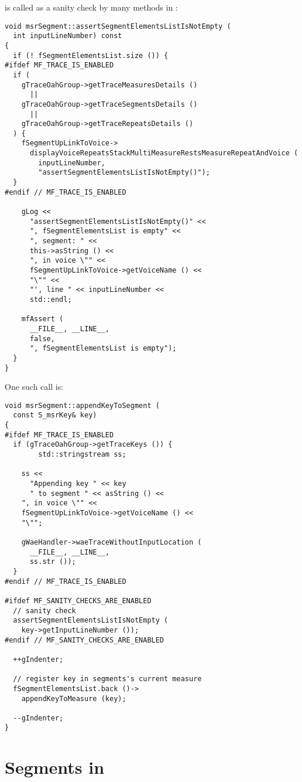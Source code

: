 is called as a sanity check by many methods in :
\begin{lstlisting}[language=CPlusPlus]
void msrSegment::assertSegmentElementsListIsNotEmpty (
  int inputLineNumber) const
{
  if (! fSegmentElementsList.size ()) {
#ifdef MF_TRACE_IS_ENABLED
  if (
    gTraceOahGroup->getTraceMeasuresDetails ()
      ||
    gTraceOahGroup->getTraceSegmentsDetails ()
      ||
    gTraceOahGroup->getTraceRepeatsDetails ()
  ) {
    fSegmentUpLinkToVoice->
      displayVoiceRepeatsStackMultiMeasureRestsMeasureRepeatAndVoice (
        inputLineNumber,
        "assertSegmentElementsListIsNotEmpty()");
  }
#endif // MF_TRACE_IS_ENABLED

    gLog <<
      "assertSegmentElementsListIsNotEmpty()" <<
      ", fSegmentElementsList is empty" <<
      ", segment: " <<
      this->asString () <<
      ", in voice \"" <<
      fSegmentUpLinkToVoice->getVoiceName () <<
      "\"" <<
      "', line " << inputLineNumber <<
      std::endl;

    mfAssert (
      __FILE__, __LINE__,
      false,
      ", fSegmentElementsList is empty");
  }
}
\end{lstlisting}

One such call is:
\begin{lstlisting}[language=CPlusPlus]
void msrSegment::appendKeyToSegment (
  const S_msrKey& key)
{
#ifdef MF_TRACE_IS_ENABLED
  if (gTraceOahGroup->getTraceKeys ()) {
		std::stringstream ss;

    ss <<
      "Appending key " << key
      " to segment " << asString () <<
    ", in voice \"" <<
    fSegmentUpLinkToVoice->getVoiceName () <<
    "\"";

    gWaeHandler->waeTraceWithoutInputLocation (
      __FILE__, __LINE__,
      ss.str ());
  }
#endif // MF_TRACE_IS_ENABLED

#ifdef MF_SANITY_CHECKS_ARE_ENABLED
  // sanity check
  assertSegmentElementsListIsNotEmpty (
    key->getInputLineNumber ());
#endif // MF_SANITY_CHECKS_ARE_ENABLED

  ++gIndenter;

  // register key in segments's current measure
  fSegmentElementsList.back ()->
    appendKeyToMeasure (key);

  --gIndenter;
}
\end{lstlisting}


\section{Segments in \mxsrToMsr{}}

